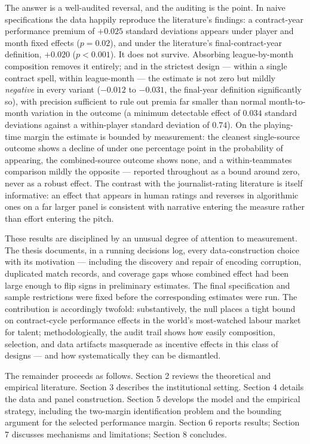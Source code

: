 \documentclass{article}
\begin{document}
The answer is a well-audited reversal, and the auditing is the point. In
naive specifications the data happily reproduce the literature's findings: a
contract-year performance premium of $+0.025$ standard deviations appears
under player and month fixed effects ($p=0.02$), and under the literature's
final-contract-year definition, $+0.020$ ($p<0.001$). It does not survive.
Absorbing league-by-month composition removes it entirely; and in the
strictest design --- within a single contract spell, within league-month ---
the estimate is not zero but mildly \emph{negative} in every variant
($-0.012$ to $-0.031$, the final-year definition significantly so), with
precision sufficient to rule out premia far smaller than normal
month-to-month variation in the outcome (a minimum detectable effect of
$0.034$ standard deviations against a within-player standard deviation of
$0.74$). On the playing-time margin the estimate is bounded by measurement:
the cleanest single-source outcome shows a decline of under one percentage
point in the probability of appearing, the combined-source outcome shows
none, and a within-teammates comparison mildly the opposite --- reported
throughout as a bound around zero, never as a robust effect. The contrast
with the journalist-rating literature is itself informative: an effect that
appears in human ratings and reverses in algorithmic ones on a far larger
panel is consistent with narrative entering the measure rather than effort
entering the pitch.

These results are disciplined by an unusual degree of attention to
measurement. The thesis documents, in a running decisions log, every
data-construction choice with its motivation --- including the discovery and
repair of encoding corruption, duplicated match records, and coverage gaps
whose combined effect had been large enough to flip signs in preliminary
estimates. The final specification and sample restrictions were fixed before
the corresponding estimates were run. The contribution is accordingly
twofold: substantively, the null places a tight bound on contract-cycle
performance effects in the world's most-watched labour market for talent;
methodologically, the audit trail shows how easily composition, selection,
and data artifacts masquerade as incentive effects in this class of designs
--- and how systematically they can be dismantled.

The remainder proceeds as follows. Section 2 reviews the theoretical and
empirical literature. Section 3 describes the institutional setting.
Section 4 details the data and panel construction. Section 5 develops the
model and the empirical strategy, including the two-margin identification
problem and the bounding argument for the selected performance margin.
Section 6 reports results; Section 7 discusses mechanisms and limitations;
Section 8 concludes.
\end{document}
